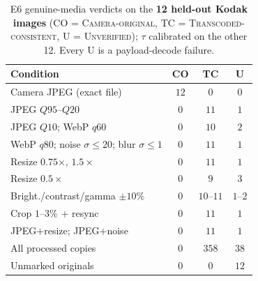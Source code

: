 \documentclass[journal]{IEEEtran}
\begin{document}
\begin{table}[t]
\centering
\caption{E6 genuine-media verdicts on the \textbf{12 held-out Kodak images}
(CO = \textsc{Camera-original}, TC = \textsc{Transcoded-consistent}, U =
\textsc{Unverified}); $\tau$ calibrated on the other 12. Every U is a
payload-decode failure.}
\label{tab:e6verdicts}
\renewcommand{\arraystretch}{1.12}
\setlength{\tabcolsep}{5pt}
\footnotesize
\begin{tabular}{@{}lccc@{}}
\toprule
\textbf{Condition} & \textbf{CO} & \textbf{TC} & \textbf{U} \\
\midrule
Camera JPEG (exact file)             & $12$ & $0$  & $0$ \\
JPEG $Q95$--$Q20$                     & $0$  & $11$ & $1$ \\
JPEG $Q10$; WebP $q60$                & $0$  & $10$ & $2$ \\
WebP $q80$; noise $\sigma\!\le\!20$; blur $\sigma\!\le\!1$ & $0$ & $11$ & $1$ \\
Resize $0.75\times,\,1.5\times$        & $0$  & $11$ & $1$ \\
Resize $0.5\times$                     & $0$  & $9$  & $3$ \\
Bright./contrast/gamma $\pm10\%$       & $0$  & $10$--$11$ & $1$--$2$ \\
Crop $1$--$3\%$ $+$ resync             & $0$  & $11$ & $1$ \\
JPEG$+$resize; JPEG$+$noise            & $0$  & $11$ & $1$ \\
\midrule
All processed copies                   & $0$  & $358$ & $38$ \\
Unmarked originals                     & $0$  & $0$  & $12$ \\
\bottomrule
\end{tabular}
\end{table}
\end{document}
